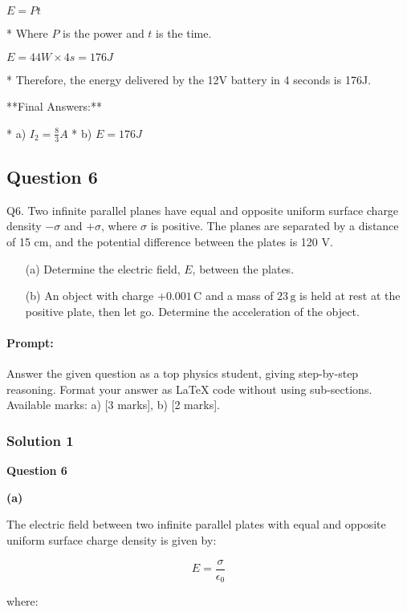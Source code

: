 \documentclass{article}
\begin{document}
    $E = Pt$

    * Where $P$ is the power and $t$ is the time. 

    $E = 44W \times 4s = 176J$

    * Therefore, the energy delivered by the 12V battery in 4 seconds is 176J.


**Final Answers:**

* a) $I_2 = \frac{8}{3} A$
* b) $E = 176 J$ 


\subsection{Question 6}
Q6. Two infinite parallel planes have equal and opposite uniform surface charge density $-\sigma$ and $+\sigma$, where $\sigma$ is positive. The planes are separated by a distance of 15 cm, and the potential difference between the plates is 120 V.

\begin{enumerate}
    \item[(a)] Determine the electric field, $E$, between the plates.
    \item[(b)] An object with charge $+0.001 \, \text{C}$ and a mass of $23 \, \text{g}$ is held at rest at the positive plate, then let go. Determine the acceleration of the object.
\end{enumerate}


\paragraph{Prompt: \\} 
Answer the given question as a top physics student, giving step-by-step reasoning. Format your answer as LaTeX code without using sub-sections. Available marks: a) [3 marks], b) [2 marks].

\subsubsection{Solution 1}
\textbf{Question 6}

\textbf{(a)} 

The electric field between two infinite parallel plates with equal and opposite uniform surface charge density is given by:

\begin{equation*}
E = \frac{\sigma}{\epsilon_0}
\end{equation*}

where:
\end{document}
